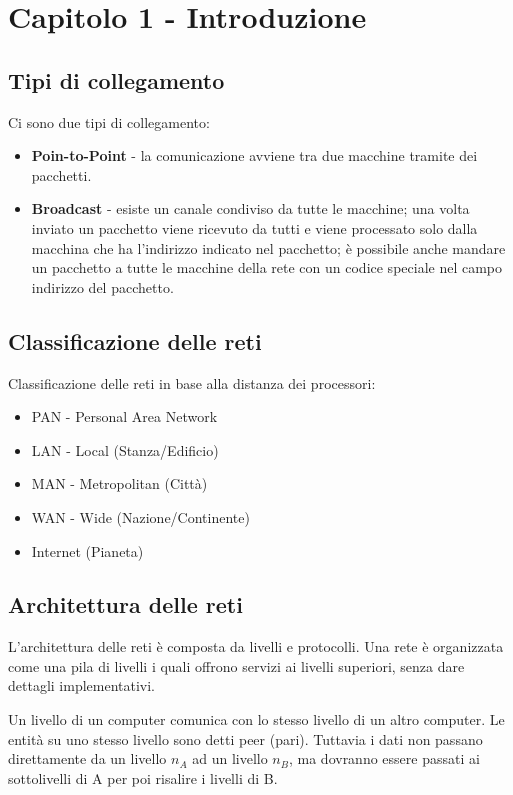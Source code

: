\section{Capitolo 1 - Introduzione}

\subsection{Tipi di collegamento}
Ci sono due tipi di collegamento:
\begin{itemize}
\item \textbf{Poin-to-Point} - la comunicazione avviene tra due macchine tramite dei pacchetti.
\item \textbf{Broadcast} - esiste un canale condiviso da tutte le macchine;
una volta inviato un pacchetto viene ricevuto da tutti e viene processato solo dalla macchina che ha l'indirizzo indicato nel pacchetto;
è possibile anche mandare un pacchetto a tutte le macchine della rete con un codice speciale nel campo indirizzo del pacchetto.
\end{itemize}

\subsection{Classificazione delle reti}
Classificazione delle reti in base alla distanza dei processori:
\begin{itemize}
\item PAN - Personal Area Network
\item LAN - Local (Stanza/Edificio)
\item MAN - Metropolitan (Città)
\item WAN - Wide (Nazione/Continente)
\item Internet (Pianeta)
\end{itemize}

\subsection{Architettura delle reti}
L'architettura delle reti è composta da livelli e protocolli.
Una rete è organizzata come una pila di livelli i quali offrono servizi ai livelli superiori, senza dare dettagli implementativi.

Un livello di un computer comunica con lo stesso livello di un altro computer.
Le entità su uno stesso livello sono detti peer (pari).
Tuttavia i dati non passano direttamente da un livello $n_A$ ad un livello $n_B$, ma dovranno essere passati ai sottolivelli di A per poi risalire i livelli di B.

